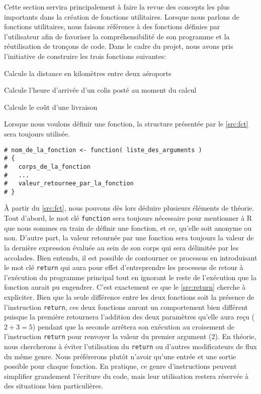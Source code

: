 Cette section servira principalement à faire la revue des concepts les plus importants dans la création de fonctions utilitaires. Lorsque nous parlons de fonctions utilitaires, nous faisons référence à des fonctions définies par l'utilisateur afin de favoriser la compréhensibilité de son programme et la réutilisation de tronçons de code. Dans le cadre du projet, nous avons pris l'initiative de construire les trois fonctions suivantes: \\
\begin{description}[style=multiline,leftmargin=2.5cm]
	\item[airportsDist] Calcule la distance en kilomètres entre deux aéroports
	\item[arrivalTime] Calcule l'heure d'arrivée d'un colis posté au moment du calcul
	\item[shippingCost] Calcule le coût d'une livraison
\end{description}

Lorsque nous voulons définir une fonction, la structure présentée par le \autoref{src:fct} sera toujours utilisée. 

\begin{lstlisting}[caption = Structure pour la définition d'une fonction,label=src:fct]
# nom_de_la_fonction <- function( liste_des_arguments )
# {
# 	corps_de_la_fonction
# 	... 
# 	valeur_retournee_par_la_fonction
# }
\end{lstlisting}

\vspace{\baselineskip}
À partir du \autoref{src:fct}, nous pouvons dès lors déduire plusieurs éléments de théorie. Tout d'abord, le mot clé \texttt{function} sera toujours nécessaire pour mentionner à R que nous sommes en train de définir une fonction, et ce, qu'elle soit anonyme ou non. D'autre part, la valeur retournée par une fonction sera toujours la valeur de la dernière expression évaluée au sein de son corps qui sera délimitée par les accolades. Bien entendu, il est possible de contourner ce processus en introduisant le mot clé \texttt{return} qui aura pour effet d'entreprendre les processus de retour à l'exécution du programme principal tout en ignorant le reste de l'exécution que la fonction aurait pu engendrer. C'est exactement ce que le \autoref{src:return} cherche à expliciter. Bien que la seule différence entre les deux fonctions soit la présence de l'instruction \texttt{return}, ces deux fonctions auront un comportement bien différent puisque la première retournera l'addition des deux paramètres qu'elle aura reçu ($2+3=5$) pendant que la seconde arrêtera son exécution au croisement de l'instruction \texttt{return} pour renvoyer la valeur du premier argument ($2$). En théorie, nous chercherons à éviter l'utilisation du \texttt{return} ou d'autres modificateurs de flux du même genre. Nous préférerons plutôt n'avoir qu'une entrée et une sortie possible pour chaque fonction. En pratique, ce genre d'instructions peuvent simplifier grandement l'écriture du code, mais leur utilisation restera réservée à des situations bien particulières.

